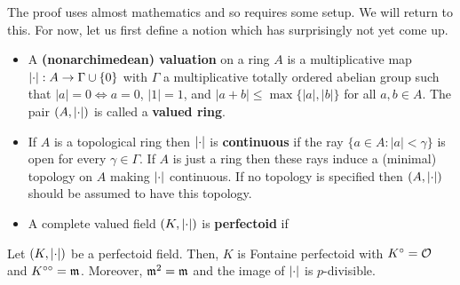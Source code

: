 \documentclass[11pt]{article}
\begin{document}
The proof uses almost mathematics and so requires some setup. We will return to this. For now, let us first define a notion which has surprisingly not yet come up.

\begin{definition}
\hfill
\begin{itemize}
\item A \textbf{(nonarchimedean) valuation} on a ring $A$ is a multiplicative map $\left\lvert\cdot\right\rvert: A\to\Gamma\cup\{0\}$ with $\Gamma$ a multiplicative totally ordered abelian group such that $|a|=0\iff a=0$, $|1|=1$, and $|a+b|\leq\max\{|a|,|b|\}$ for all $a,b\in A$. The pair $(A,\left\lvert\cdot\right\rvert)$ is called a \textbf{valued ring}.

\item If $A$ is a topological ring then $\left\lvert\cdot\right\rvert$ is \textbf{continuous} if the ray $\{a\in A : |a|<\gamma\}$ is open for every $\gamma\in\Gamma$. If $A$ is just a ring then these rays induce a (minimal) topology on $A$ making $\left\lvert\cdot\right\rvert$ continuous. If no topology is specified then $(A,\left\lvert\cdot\right\rvert)$ should be assumed to have this topology.

\item A complete valued field $(K,\left\lvert\cdot\right\rvert)$ is \textbf{perfectoid} if 
\end{itemize}
\end{definition}

\begin{claim}
Let $(K,\left\lvert\cdot\right\rvert)$ be a perfectoid field. Then, $K$ is Fontaine perfectoid with $K^{\circ}=\mathcal{O}$ and $K^{\circ\circ}=\mathfrak{m}$. Moreover, $\mathfrak{m}^2=\mathfrak{m}$ and the image of $\left\lvert\cdot\right\rvert$ is $p$-divisible.
\end{claim}
\end{document}
